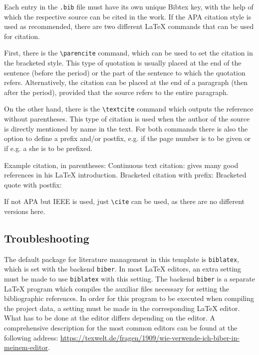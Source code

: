 Each entry in the \texttt{.bib} file must have its own unique Bibtex key, with the help of which the respective source can be cited in the work.
If the APA citation style is used as recommended, there are two different \LaTeX{} commands that can be used for citation.

First, there is the \texttt{\textbackslash{}parencite} command, which can be used to set the citation in the bracketed style.
This type of quotation is usually placed at the end of the sentence (before the period) or the part of the sentence to which the quotation refers.
Alternatively, the citation can be placed at the end of a paragraph (then after the period), provided that the source refers to the entire paragraph.

On the other hand, there is the \texttt{\textbackslash{}textcite} command which outputs the reference without parentheses.
This type of citation is used when the author of the source is directly mentioned by name in the text.
For both commands there is also the option to define a prefix and/or postfix, e.g. if the page number is to be given or if e.g. a \glqq{}she\grqq{} is to be prefixed.

Example citation, in parentheses: \parencite{Amann.2013}\nl
Continuous text citation: \textcite{Stein:2014} gives many good references in his \LaTeX{} introduction.\nl
Bracketed citation with prefix: \parencite[siehe auch][]{Amann.2013}\nl
Bracketed quote with postfix: \parencite[][S.~5f.]{Amann.2013}

If not APA but IEEE is used, just \texttt{\textbackslash{}cite} can be used, as there are no different versions here.

\subsection*{Troubleshooting}

The default package for literature management in this template is \texttt{biblatex}, which is set with the backend \texttt{biber}.
In most \LaTeX{} editors, an extra setting must be made to use \texttt{biblatex} with this setting.
The backend \texttt{biber} is a separate \LaTeX{} program which compiles the auxiliar files necessary for setting the bibliographic references.
In order for this program to be executed when compiling the project data, a setting must be made in the corresponding \LaTeX{} editor.
What has to be done at the editor differs depending on the editor.
A comprehensive description for the most common editors can be found at the following address: \href{https://texwelt.de/fragen/1909/wie-verwende-ich-biber-in-meinem-editor}{https://texwelt.de/fragen/1909/wie-verwende-ich-biber-in-meinem-editor}.

